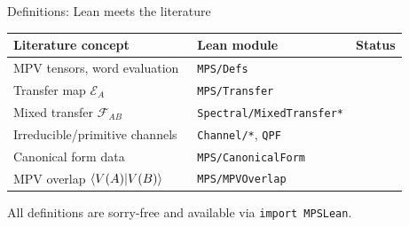 \documentclass[aspectratio=169,10pt]{beamer}
\newcommand{\cE}{\mathcal{E}}
\newcommand{\cF}{\mathcal{F}}
\begin{document}
\begin{frame}{Definitions: Lean meets the literature}
    \vspace{-0.7em}

    \renewcommand{\arraystretch}{1.15}
    \begin{tabular}{p{} p{} p{}}
        \toprule
        \textbf{Literature concept} & \textbf{Lean module}             & \textbf{Status} \\
        \midrule
        \rowcolor{cardbg}
        MPV tensors, word evaluation~\cite{Perez-Garcia2007Matrix,Cirac2021Matrix}
                                    & \texttt{MPS/Defs}                & \proved{}       \\
        \rowcolor{cardbg}
        Transfer map $\cE_A$~\cite{Cirac2017Annals,Wolf2012Quantum}
                                    & \texttt{MPS/Transfer}            & \proved{}       \\
        \rowcolor{cardbg}
        Mixed transfer $\cF_{AB}$~\cite{Perez-Garcia2007Matrix}
                                    & \texttt{Spectral/MixedTransfer*} & \proved{}       \\
        \rowcolor{cardbg}
        Irreducible/primitive channels~\cite{Evans1978Spectral,Wolf2012Quantum}
                                    & \texttt{Channel/*}, \texttt{QPF} & \proved{}       \\
        \rowcolor{cardbg}
        Canonical form data~\cite{Cirac2021Matrix}
                                    & \texttt{MPS/CanonicalForm}       & \proved{}       \\
        \rowcolor{cardbg}
        MPV overlap $\braket{V(A)|V(B)}$
                                    & \texttt{MPS/MPVOverlap}          & \proved{}       \\
        \bottomrule
    \end{tabular}

    \vspace{0.3em}
    \textcolor{dimwhite}{\footnotesize All definitions are sorry-free and available via \texttt{import MPSLean}.}
\end{frame}
\end{document}

